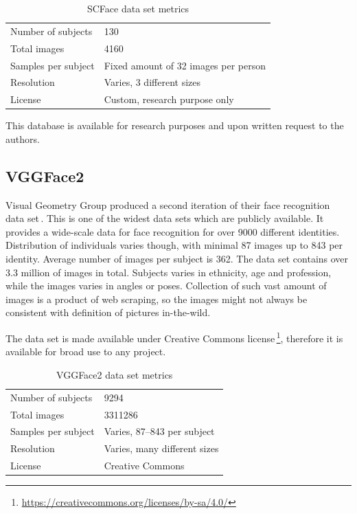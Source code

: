 \begin{table}[ht]
    \centering
    \begin{tabularx}{.8\textwidth}{l|X}
        \toprule
        Number of subjects & 130 \\
        Total images & \num{4160} \\
        Samples per subject & Fixed amount of 32 images per person \\
        Resolution & Varies, 3 different sizes \\
        License & Custom, research purpose only \\
        \bottomrule
    \end{tabularx}
    \caption{SCFace data set metrics}
\end{table}

This database is available for research purposes and upon written request to the authors.

\subsection{VGGFace2}

Visual Geometry Group produced a second iteration of their face recognition data set\,\cite{VVGFace2}. This is one of the widest data sets which are publicly available. It provides a wide-scale data for face recognition for over 9000 different identities. Distribution of individuals varies though, with minimal 87 images up to 843 per identity. Average number of images per subject is 362. The data set contains over \num{3.3} million of images in total. Subjects varies in ethnicity, age and profession, while the images varies in angles or poses. Collection of such vast amount of images is a product of web scraping, so the images might not always be consistent with definition of pictures in-the-wild.

The data set is made available under Creative Commons license\,\footnote{\url{https://creativecommons.org/licenses/by-sa/4.0/}}, therefore it is available for broad use to any project.

\begin{table}[ht]
    \centering
    \begin{tabularx}{.8\textwidth}{l|X}
        \toprule
        Number of subjects & \num{9294} \\
        Total images & \num{3311286} \\
        Samples per subject & Varies, 87--843 per subject \\
        Resolution & Varies, many different sizes \\
        License & Creative Commons \\
        \bottomrule
    \end{tabularx}
    \caption{VGGFace2 data set metrics}
\end{table}

